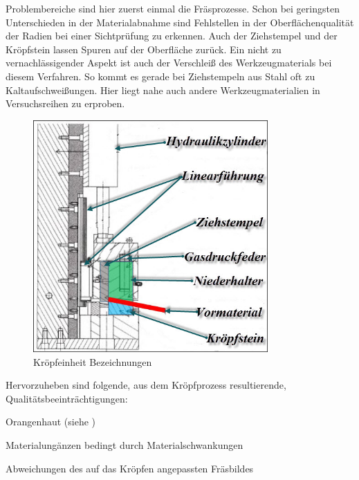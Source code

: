 \documentclass[12pt,a4paper,parskip]{scrartcl}
\begin{document}
 
Problembereiche sind hier zuerst einmal die Fräsprozesse. Schon bei geringsten Unterschieden in der Materialabnahme sind Fehlstellen in der Oberflächenqualität der Radien bei einer Sichtprüfung zu erkennen. Auch der Ziehstempel und der Kröpfstein lassen Spuren auf der Oberfläche zurück. Ein nicht zu vernachlässigender Aspekt ist auch der Verschleiß des Werkzeugmaterials bei diesem Verfahren. So kommt es gerade bei Ziehstempeln aus Stahl oft zu Kaltaufschweißungen. Hier liegt nahe auch andere Werkzeugmaterialien in Versuchsreihen zu erproben.
\begin{figure}[hbtp]
\centering
\includegraphics[width=0.8\textwidth]{kropfeinpic}
\caption{Kröpfeinheit Bezeichnungen}
\label{krofpfarbbezeich}
\end{figure}





\medskip

Hervorzuheben sind folgende, aus dem Kröpfprozess resultierende, Qualitätsbeeinträchtigungen:
\begin{itemize*}
\item Orangenhaut (siehe )
\item Materialungänzen bedingt durch Materialschwankungen
\item Abweichungen des auf das Kröpfen angepassten Fräsbildes
\end{itemize*}
\end{document}
